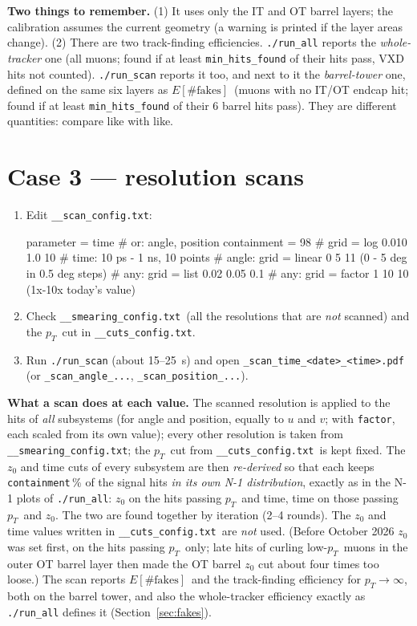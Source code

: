 \documentclass[11pt,letterpaper]{article}
\newcommand{\code}[1]{\texttt{#1}}
\newcommand{\pT}{\ensuremath{p_T}}
\newcommand{\cuts}{\code{\_\_cuts\_config.txt}}
\newcommand{\smear}{\code{\_\_smearing\_config.txt}}
\newcommand{\scan}{\code{\_\_scan\_config.txt}}
\newcommand{\Efakes}{\ensuremath{E[\#\mathrm{fakes}]}}
\begin{document}
\textbf{Two things to remember.}
(1) It uses only the IT and OT barrel layers; the calibration assumes the
current geometry (a warning is printed if the layer areas change).
(2) There are two track-finding efficiencies. \code{./run\_all} reports the
\emph{whole-tracker} one (all muons; found if at least \code{min\_hits\_found}
of their hits pass, VXD hits not counted). \code{./run\_scan} reports it too,
and next to it the \emph{barrel-tower} one, defined on the same six layers as
\Efakes\ (muons with no IT/OT endcap hit; found if at least
\code{min\_hits\_found} of their 6 barrel hits pass). They are different
quantities: compare like with like.

\section{Case 3 --- resolution scans}\label{sec:scan}
\begin{enumerate}[leftmargin=1.5em]
\item Edit \scan:
\begin{shell}
parameter   = time               # or: angle, position
containment = 98                 # %
grid        = log 0.010 1.0 10   # time: 10 ps - 1 ns, 10 points
#  angle:  grid = linear 0 5 11   (0 - 5 deg in 0.5 deg steps)
#  any:    grid = list 0.02 0.05 0.1
#  any:    grid = factor 1 10 10  (1x-10x today's value)
\end{shell}
\item Check \smear\ (all the resolutions that are \emph{not} scanned) and
  the \pT\ cut in \cuts.
\item Run \code{./run\_scan} (about 15--25~s) and open
  \code{\_scan\_time\_<date>\_<time>.pdf} (or \code{\_scan\_angle\_...},
  \code{\_scan\_position\_...}).
\end{enumerate}

\textbf{What a scan does at each value.} The scanned resolution is applied
to the hits of \emph{all} subsystems (for angle and position, equally to
$u$ and $v$; with \code{factor}, each scaled from its own value);
every other resolution is taken from \smear; the \pT\ cut from \cuts\ is
kept fixed. The $z_0$ and time cuts of every subsystem are then
\emph{re-derived} so that each keeps \code{containment}\,\% of the signal
hits \emph{in its own N-1 distribution}, exactly as in the N-1 plots of
\code{./run\_all}: $z_0$ on the hits passing \pT\ and time, time on those
passing \pT\ and $z_0$. The two are found together by iteration (2--4
rounds). The $z_0$ and time values written in \cuts\ are \emph{not} used.
(Before October 2026 $z_0$ was set first, on the hits passing \pT\ only;
late hits of curling low-\pT\ muons in the outer OT barrel layer then made
the OT barrel $z_0$ cut about four times too loose.) The scan reports \Efakes\ and the track-finding efficiency for
$\pT\to\infty$, both on the barrel tower, and also the whole-tracker
efficiency exactly as \code{./run\_all} defines it (Section~\ref{sec:fakes}).
\end{document}
